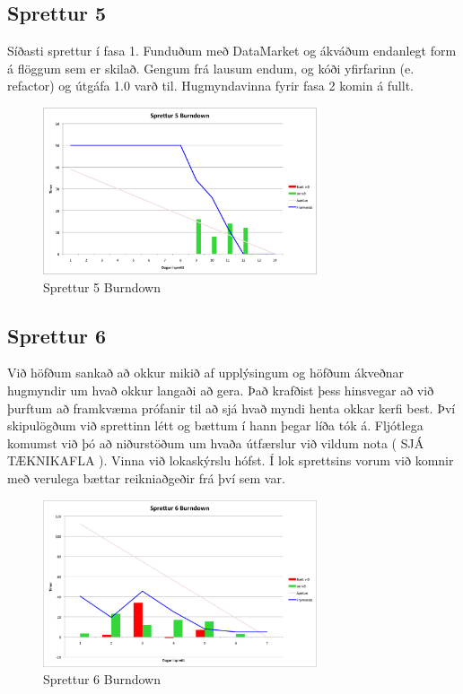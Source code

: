 \documentclass{article}
\begin{document}
\subsection{Sprettur 5}
Síðasti sprettur í fasa 1. Funduðum með DataMarket og ákváðum endanlegt form á flöggum sem er skilað. Gengum frá lausum endum, og kóði yfirfarinn 
(e. refactor) og útgáfa 1.0 varð til. Hugmyndavinna fyrir fasa 2 komin á fullt.

\begin{figure}[H]
 \centering
 \includegraphics[width=0.72\textwidth]{Sprettur5_Burndown.png}
 \caption{Sprettur 5 Burndown}
\end{figure}

\subsection{Sprettur 6}
Við höfðum sankað að okkur mikið af upplýsingum og höfðum ákveðnar hugmyndir um hvað okkur langaði að gera. Það krafðist þess hinsvegar að við 
þurftum að framkvæma prófanir til að sjá hvað myndi henta okkar kerfi best. Því skipulögðum við sprettinn létt og bættum í hann þegar líða tók á. 
Fljótlega komumst við þó að niðurstöðum um hvaða útfærslur við vildum nota ( SJÁ TÆKNIKAFLA ). Vinna við lokaskýrslu hófst. Í lok sprettsins 
vorum við komnir með verulega bættar reikniaðgeðir frá því sem var.

\begin{figure}[H]
 \centering
 \includegraphics[width=0.72\textwidth]{Sprettur6_Burndown.png}
 \caption{Sprettur 6 Burndown}
\end{figure}
\end{document}
